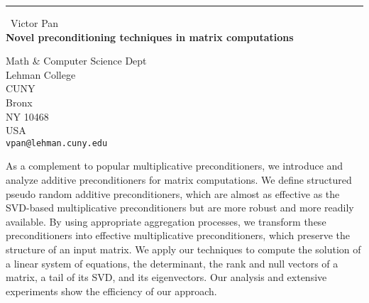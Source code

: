 \documentclass{report}
\begin{document}
\begin{center}
\rule{6in}{1pt} \
{\large Victor Pan \\
{\bf Novel preconditioning techniques in matrix computations}}

Math & Computer Science Dept \\ Lehman College \\ CUNY \\ Bronx \\ NY 10468 \\ USA
\\
{\tt vpan@lehman.cuny.edu}\end{center}

As a complement to popular multiplicative preconditioners, we introduce and
analyze additive preconditioners for matrix computations. We define structured
pseudo random additive preconditioners, which are almost as effective as the
SVD-based multiplicative preconditioners but are more robust and more readily
available. By using appropriate aggregation processes, we transform these
preconditioners into effective multiplicative preconditioners, which preserve
the structure of an input matrix. We apply our techniques to compute the solution
of a linear system of equations, the determinant, the rank and null vectors of
a matrix, a tail of its SVD, and its eigenvectors. Our analysis and extensive
experiments show the efficiency of our approach.
\end{document}
